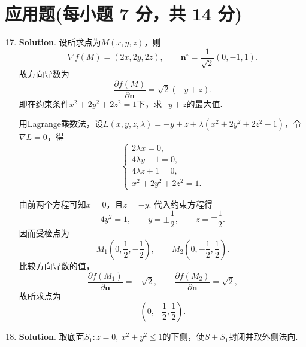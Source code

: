 \documentclass[../main.tex]{subfiles}
\begin{document}
\section{应用题(每小题 7 分，共 14 分)}
\begin{enumerate}
  \setcounter{enumi}{16}
  \item \textbf{Solution}. 设所求点为$M(x,y,z)$，则
        \[
          \nabla f(M)=(2x,2y,2z),\qquad \boldsymbol{n}^{\circ}=\frac{1}{\sqrt2}(0,-1,1).
        \]
        故方向导数为
        \[
          \frac{\partial f(M)}{\partial \boldsymbol{n}}=\sqrt2(-y+z).
        \]
        即在约束条件$x^{2}+2y^{2}+2z^{2}=1$下，求$-y+z$的最大值.

        用Lagrange乘数法，设$L(x,y,z,\lambda)=-y+z+\lambda(x^{2}+2y^{2}+2z^{2}-1)$，令$\nabla L=0$，得
        \[
          \begin{cases}
            2\lambda x=0,   \\
            4\lambda y-1=0, \\
            4\lambda z+1=0, \\
            x^{2}+2y^{2}+2z^{2}=1.
          \end{cases}
        \]

        由前两个方程可知$x=0$，且$z=-y$. 代入约束方程得
        \[
          4y^{2}=1,\qquad y=\pm\frac12,\qquad z=\mp\frac12.
        \]
        因而受检点为
        \[
          M_1\left(0,\frac12,-\frac12\right),\qquad M_2\left(0,-\frac12,\frac12\right).
        \]
        比较方向导数的值，
        \[
          \frac{\partial f(M_1)}{\partial \boldsymbol{n}}=-\sqrt2,\qquad
          \frac{\partial f(M_2)}{\partial \boldsymbol{n}}=\sqrt2,
        \]
        故所求点为
        \[
          \left(0,-\frac12,\frac12\right).
        \]

  \item \textbf{Solution}. 取底面$S_{1}:z=0,\ x^{2}+y^{2}\leq1$的下侧，使$S+S_{1}$封闭并取外侧法向.


\end{enumerate}
\end{document}
